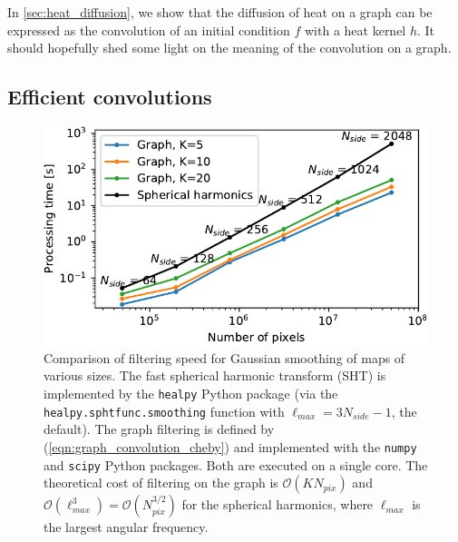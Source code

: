 \documentclass[final,twocolumn,3p,times,sort&compress]{elsarticle}
\newcommand{\eqnref}[1]{(\ref{eqn:#1})}
\newcommand{\1}{\b{1}}              %
\newcommand{\0}{\b{0}}              %
\newcommand{\bO}{\mathcal{O}}
\begin{document}
In \ref{sec:heat_diffusion}, we show that the diffusion of heat on a graph can be expressed as the convolution of an initial condition $f$ with a heat kernel $h$. It should hopefully shed some light on the meaning of the convolution on a graph.

\subsection{Efficient convolutions}
\label{sec:efficient_convolution}

\begin{figure}
    \centering
    \includegraphics[width=\linewidth]{filtering_speed}
    \caption{Comparison of filtering speed for Gaussian smoothing of maps of various sizes.
    The fast spherical harmonic transform (SHT) is implemented by the \texttt{healpy} Python package (via the \texttt{healpy.sphtfunc.smoothing} function with $\ell_{max} = 3 N_{side} - 1$, the default).
    The graph filtering is defined by \eqnref{graph_convolution_cheby} and implemented with the \texttt{numpy} and \texttt{scipy} Python packages.
    Both are executed on a single core.
	The theoretical cost of filtering on the graph is $\bO(K N_{pix})$ and $\bO(\ell_{max}^3) = \bO(N_{pix}^{3/2})$ for the spherical harmonics, where $\ell_{max}$ is the largest angular frequency.}
    \label{fig:filtering_speed}
\end{figure}
\end{document}
